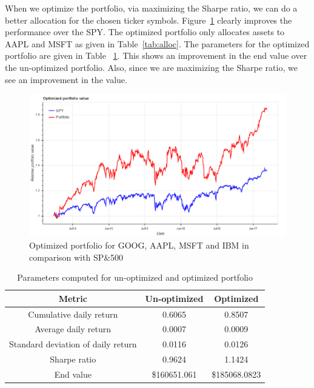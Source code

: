 \documentclass[12pt]{article}
\begin{document}
\begin{itemize}
When we optimize the portfolio, via maximizing the Sharpe ratio, we can do a better allocation for the chosen ticker symbols.  Figure~\ref{fig:optimized} clearly improves the performance over the SPY. The optimized portfolio only allocates assets to AAPL and MSFT as given in Table~\ref{tab:alloc}. The parameters for the optimized portfolio are given in Table ~\ref{tab:portparam}. This shows an improvement in the end value over the un-optimized portfolio. Also, since we are maximizing the Sharpe ratio, we see an improvement in the value.

\begin{figure}[!htbp]
\begin{center}
\includegraphics[height=0.5\textheight,width=\textwidth]{optimized.png}
\caption{Optimized portfolio for GOOG, AAPL, MSFT and IBM in comparison with SP\&500}
\label{fig:optimized}
\end{center}
\end{figure}


\begin{table}
\begin{center}
\begin{tabular} {|c|c|c|}
\hline \hline
\textbf{Metric} & \textbf{Un-optimized} & \textbf{Optimized}  \\ \hline
Cumulative daily return & 0.6065 & 0.8507 \\ \hline
Average daily return & 0.0007 & 0.0009\\ \hline
Standard deviation of daily return  & 0.0116 & 0.0126  \\ \hline
Sharpe ratio & 0.9624 & 1.1424 \\ \hline
End value & \$160651.061 & \$185068.0823 \\ \hline
\hline
\end{tabular}
\end{center}
\caption{Parameters computed for un-optimized and optimized portfolio}
\label{tab:portparam}
\end{table}




\end{itemize}
\end{document}
